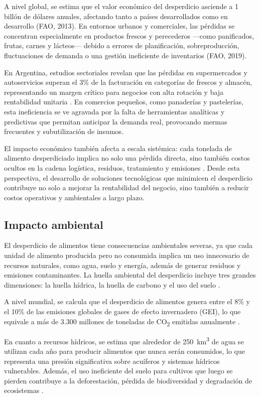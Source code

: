 A nivel global, se estima que el valor económico del desperdicio asciende a 1 billón de dólares anuales, afectando tanto a países desarrollados como en desarrollo (FAO, 2013). En entornos urbanos y comerciales, las pérdidas se concentran especialmente en productos frescos y perecederos —como panificados, frutas, carnes y lácteos— debido a errores de planificación, sobreproducción, fluctuaciones de demanda o una gestión ineficiente de inventarios (FAO, 2019).

En Argentina, estudios sectoriales revelan que las pérdidas en supermercados y autoservicios superan el 3\% de la facturación en categorías de frescos y almacén, representando un margen crítico para negocios con alta rotación y baja rentabilidad unitaria \parencite{weteam2021}. En comercios pequeños, como panaderías y pastelerías, esta ineficiencia se ve agravada por la falta de herramientas analíticas y predictivas que permitan anticipar la demanda real, provocando mermas frecuentes y subutilización de insumos.

El impacto económico también afecta a escala sistémica: cada tonelada de alimento desperdiciado implica no solo una pérdida directa, sino también costos ocultos en la cadena logística, residuos, tratamiento y emisiones \parencite{refed2016}. Desde esta perspectiva, el desarrollo de soluciones tecnológicas que minimicen el desperdicio contribuye no solo a mejorar la rentabilidad del negocio, sino también a reducir costos operativos y ambientales a largo plazo.

\subsection{Impacto ambiental}

El desperdicio de alimentos tiene consecuencias ambientales severas, ya que cada unidad de alimento producida pero no consumida implica un uso innecesario de recursos naturales, como agua, suelo y energía, además de generar residuos y emisiones contaminantes. La huella ambiental del desperdicio incluye tres grandes dimensiones: la huella hídrica, la huella de carbono y el uso del suelo \parencite{fao2013}.

A nivel mundial, se calcula que el desperdicio de alimentos genera entre el 8\% y el 10\% de las emisiones globales de gases de efecto invernadero (GEI), lo que equivale a más de 3.300 millones de toneladas de CO\textsubscript{2} emitidas anualmente \parencite{unep2021}. 

En cuanto a recursos hídricos, se estima que alrededor de 250~km\textsuperscript{3} de agua se utilizan cada año para producir alimentos que nunca serán consumidos, lo que representa una presión significativa sobre acuíferos y sistemas hídricos vulnerables. Además, el uso ineficiente del suelo para cultivos que luego se pierden contribuye a la deforestación, pérdida de biodiversidad y degradación de ecosistemas \parencite{kummu2012}.

